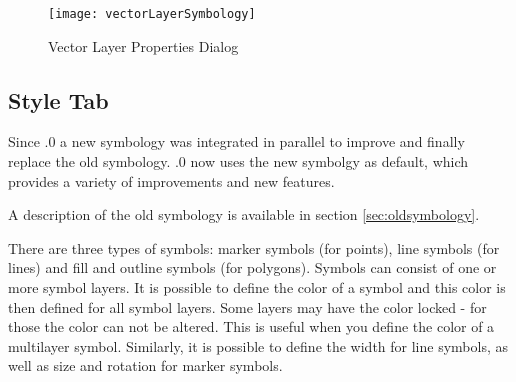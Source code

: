 \begin{figure}[ht]
   \centering
   \texttt{[image: vectorLayerSymbology]}
   \caption{Vector Layer Properties Dialog \nixcaption}\label{fig:vector_symbology}
 \end{figure}

\subsection{Style Tab}\label{sec:symbology}

Since .0 a new symbology was integrated in parallel to improve and 
finally replace the old symbology. .0 now uses the new symbolgy as default, 
which provides a variety of improvements and new features. 

A description of the old symbology is available in section 
\ref{sec:oldsymbology}.


There are three types of symbols: marker symbols (for points), line symbols (for 
lines) and fill and outline symbols (for polygons). Symbols can consist of one or 
more symbol layers. It is possible to define the color of a symbol and this color 
is then defined for all symbol layers. Some layers may have the color locked - for 
those the color can not be altered. This is useful when you define the color of a multilayer symbol. Similarly, it is possible to define the width for line symbols, 
as well as size and rotation for marker symbols.

\label{symboltypes}


